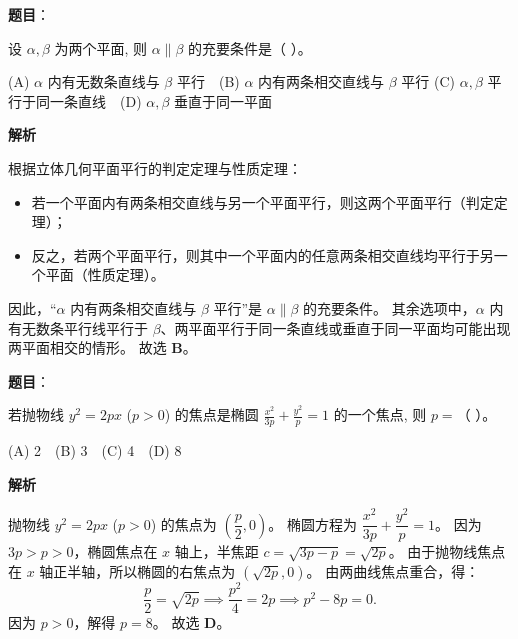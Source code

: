 \begin{answer}

\textbf{题目}：

设 $\alpha, \beta$ 为两个平面, 则 $\alpha \parallel \beta$ 的充要条件是（ ）。

(A) $\alpha$ 内有无数条直线与 $\beta$ 平行　(B) $\alpha$ 内有两条相交直线与 $\beta$ 平行
(C) $\alpha, \beta$ 平行于同一条直线　(D) $\alpha, \beta$ 垂直于同一平面

\textbf{解析}

根据立体几何平面平行的判定定理与性质定理：
\begin{itemize}
\item 若一个平面内有两条相交直线与另一个平面平行，则这两个平面平行（判定定理）；
\item 反之，若两个平面平行，则其中一个平面内的任意两条相交直线均平行于另一个平面（性质定理）。
\end{itemize}
因此，“$\alpha$ 内有两条相交直线与 $\beta$ 平行”是 $\alpha \parallel \beta$ 的充要条件。
其余选项中，$\alpha$ 内有无数条平行线平行于 $\beta$、两平面平行于同一条直线或垂直于同一平面均可能出现两平面相交的情形。
故选 \textbf{B}。


\end{answer}
\begin{answer}

\textbf{题目}：

若抛物线 $y^2 = 2px$ ($p > 0$) 的焦点是椭圆 $\frac{x^2}{3p} + \frac{y^2}{p} = 1$ 的一个焦点, 则 $p =$（ ）。

(A) 2　(B) 3　(C) 4　(D) 8

\textbf{解析}

抛物线 $y^2 = 2px$ ($p > 0$) 的焦点为 $\left(\dfrac{p}{2}, 0\right)$。
椭圆方程为 $\dfrac{x^2}{3p} + \dfrac{y^2}{p} = 1$。
因为 $3p > p > 0$，椭圆焦点在 $x$ 轴上，半焦距 $c = \sqrt{3p - p} = \sqrt{2p}$。
由于抛物线焦点在 $x$ 轴正半轴，所以椭圆的右焦点为 $(\sqrt{2p}, 0)$。
由两曲线焦点重合，得：
\nopagebreak[4]
\[\frac{p}{2} = \sqrt{2p} \implies \frac{p^2}{4} = 2p \implies p^2 - 8p = 0.\]
因为 $p > 0$，解得 $p = 8$。
故选 \textbf{D}。


\end{answer}
